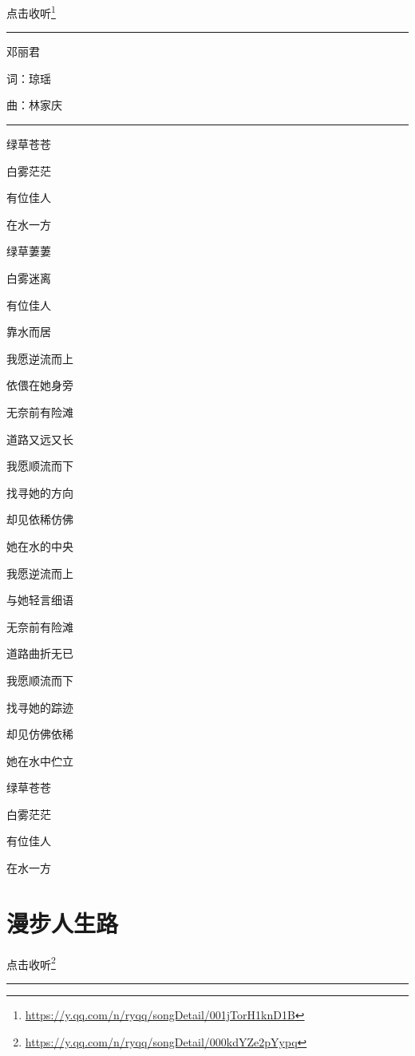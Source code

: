 \documentclass[]{ctexbook}
\renewcommand{\href}[2]{#2\footnote{\url{#1}}}
\begin{document}
\href{https://y.qq.com/n/ryqq/songDetail/001jTorH1knD1B}{点击收听}

\begin{center}\rule{0.5\linewidth}{0.5pt}\end{center}

邓丽君

词：琼瑶

曲：林家庆

\begin{center}\rule{0.5\linewidth}{0.5pt}\end{center}

绿草苍苍

白雾茫茫

有位佳人

在水一方

绿草萋萋

白雾迷离

有位佳人

靠水而居

我愿逆流而上

依偎在她身旁

无奈前有险滩

道路又远又长

我愿顺流而下

找寻她的方向

却见依稀仿佛

她在水的中央

我愿逆流而上

与她轻言细语

无奈前有险滩

道路曲折无已

我愿顺流而下

找寻她的踪迹

却见仿佛依稀

她在水中伫立

绿草苍苍

白雾茫茫

有位佳人

在水一方

\section*{漫步人生路}\label{walk-the-road-of-life}


\href{https://y.qq.com/n/ryqq/songDetail/000kdYZe2pYypq}{点击收听}

\begin{center}\rule{0.5\linewidth}{0.5pt}\end{center}
\end{document}
